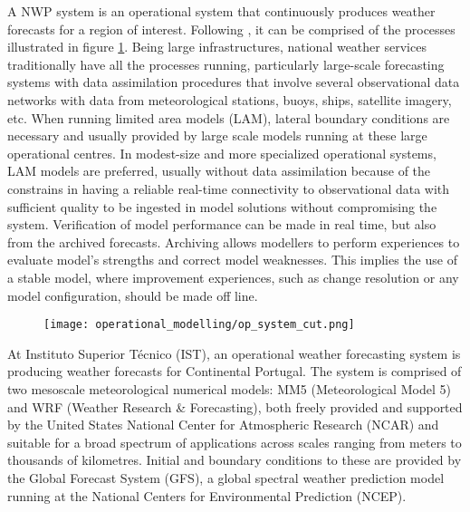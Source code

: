 A NWP system is an operational system that continuously produces weather forecasts for a region of interest. Following \cite{Warner2011}, it can be comprised of the processes illustrated in figure \ref{fig:op_scheme}. Being large infrastructures, national weather services traditionally have all the processes running, particularly large-scale forecasting systems with data assimilation procedures that involve several observational data networks with data from meteorological stations, buoys, ships, satellite imagery, etc. When running limited area models (LAM), lateral boundary conditions are necessary and usually provided by large scale models running at these large operational centres. In modest-size and more specialized operational systems, LAM models are preferred, usually without data assimilation because of the constrains in having a reliable real-time connectivity to observational data with sufficient quality to be ingested in model solutions without compromising the system. Verification of model performance can be made in real time, but also from the archived forecasts. Archiving allows modellers to perform experiences to evaluate model's strengths and correct model weaknesses. This implies the use of a stable model, where improvement experiences, such as change resolution or any model configuration, should be made off line.

\begin{figure}[!htp]
    \centering
     \texttt{[image: operational\_modelling/op\_system\_cut.png]}
    \label{fig:op_scheme}
\end{figure}
\FloatBarrier

At Instituto Superior T\'{e}cnico (IST), an operational weather forecasting system is producing weather forecasts for Continental Portugal. The system is comprised of two mesoscale meteorological numerical models: MM5 (Meteorological Model 5) and WRF (Weather Research \& Forecasting), both freely provided and supported by the United States National Center for Atmospheric Research (NCAR) and suitable for a broad spectrum of applications across scales ranging from meters to thousands of kilometres. Initial and boundary conditions to these are provided by the Global Forecast System (GFS), a global spectral weather prediction model running at the National Centers for Environmental Prediction (NCEP).

